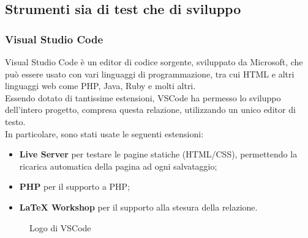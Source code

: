 \documentclass{article}
\begin{document}
\subsection{Strumenti sia di test che di sviluppo}
\subsubsection*{Visual Studio Code}
Visual Studio Code è un editor di codice sorgente, sviluppato da Microsoft, che può essere usato con vari linguaggi di programmazione, tra cui HTML e altri linguaggi web come PHP, Java, Ruby e molti altri.\\
Essendo dotato di tantissime estensioni, VSCode ha permesso lo sviluppo dell'intero progetto, compresa questa relazione, utilizzando un unico editor di testo.\\
In particolare, sono stati usate le seguenti estensioni:
\begin{itemize}
	\item \textbf{Live Server} per testare le pagine statiche (HTML/CSS), permettendo la ricarica automatica della pagina ad ogni salvataggio;
	\item \textbf{PHP} per il supporto a PHP;
	\item \textbf{LaTeX Workshop} per il supporto alla stesura della relazione.
\end{itemize}
\begin{figure}[H]
	\centering
	\caption{Logo di VSCode}
\end{figure}
\end{document}

